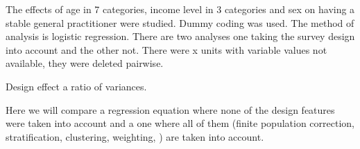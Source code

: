 The effects of age in 7 categories, income level in 3 categories and sex on having a stable general practitioner were studied. Dummy coding was used. The method of analysis is logistic regression. There are two analyses one taking the survey design into account and the other not. There were x units with variable values not available, they were deleted pairwise. 

Design effect a ratio of variances.

Here we will compare a regression equation where none of the design features were taken into account and a one where all of them (finite population correction, stratification, clustering, weighting, ) are taken into account.



